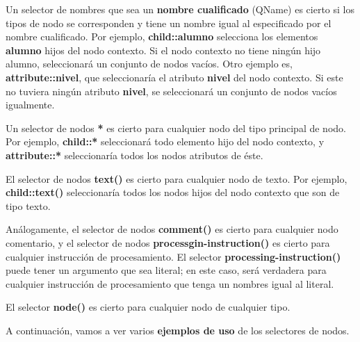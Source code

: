 Un selector de nombres que sea un \textbf{nombre cualificado} (QName) es cierto si los tipos de nodo se corresponden y tiene un nombre igual al especificado por el nombre cualificado. Por ejemplo, \textbf{child::alumno} selecciona los elementos \textbf{alumno} hijos del nodo contexto. Si el nodo contexto no tiene ningún hijo alumno, seleccionará un conjunto de nodos vacíos. Otro ejemplo es, \textbf{attribute::nivel}, que seleccionaría el atributo \textbf{nivel} del nodo contexto. Si este no tuviera ningún atributo \textbf{nivel}, se seleccionará un conjunto de nodos vacíos igualmente.

Un selector de nodos \textbf{*} es cierto para cualquier nodo del tipo principal de nodo. Por ejemplo, \textbf{child::*} seleccionará todo elemento hijo del nodo contexto, y \textbf{attribute::*} seleccionaría todos los nodos atributos de éste.

El selector de nodos \textbf{text()} es cierto para cualquier nodo de texto. Por ejemplo, \textbf{child::text()} seleccionaría todos los nodos hijos del nodo contexto que son de tipo texto.

Análogamente, el selector de nodos \textbf{comment()} es cierto para cualquier nodo comentario, y el selector de nodos \textbf{processgin-instruction()} es cierto para cualquier instrucción de procesamiento. El selector \textbf{processing-instruction()} puede tener un argumento que sea literal; en este caso, será verdadera para cualquier instrucción de procesamiento que tenga un nombres igual al literal.

El selector \textbf{node()} es cierto para cualquier nodo de cualquier tipo.

A continuación, vamos a ver varios \textbf{ejemplos de uso} de los selectores de nodos.

